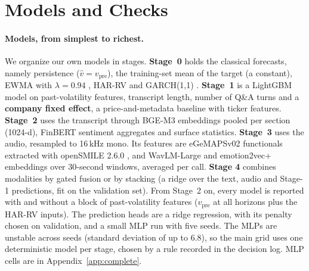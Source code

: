 \section{Models and Checks}
\label{sec:setup}

\paragraph{Models, from simplest to richest.}
We organize our own models in stages. \textbf{Stage~0} holds the classical
forecasts, namely persistence ($\hat v = v_{\mathrm{pre}}$), the
training-set mean of the target (a constant), EWMA with
$\lambda{=}0.94$ \citep{riskmetrics1996}, HAR-RV \citep{corsi2009har}
and GARCH(1,1) \citep{bollerslev1986}. \textbf{Stage~1} is a LightGBM model
\citep{lightgbm2017} on past-volatility features, transcript length,
number of Q\&A turns and a \textbf{company fixed effect}, a price-and-metadata
baseline with ticker features. \textbf{Stage~2} uses the transcript through BGE-M3 \citep{bge2024}
embeddings pooled per section (1024-d), FinBERT \citep{finbert}
sentiment aggregates and surface statistics. \textbf{Stage~3} uses the audio,
resampled to 16\,kHz mono. Its features are eGeMAPSv02 functionals
\citep{egemaps2016} extracted with openSMILE 2.6.0 \citep{eyben2010opensmile},
and WavLM-Large \citep{wavlm} and emotion2vec+ \citep{emotion2vec} embeddings
over 30-second windows, averaged per call.
\textbf{Stage 4} combines modalities by
gated fusion or by stacking (a ridge over the text, audio and Stage-1 predictions,
fit on the validation set). From Stage~2 on, every model is reported with and
without a block of past-volatility features ($v_{\mathrm{pre}}$ at all horizons
plus the HAR-RV inputs). The prediction heads are a ridge regression, with its
penalty chosen on validation, and a small MLP run with five seeds. The MLPs are
unstable across seeds (standard deviation of \Rtwo{} up to 6.8), so the main grid
uses one deterministic model per stage, chosen by a rule recorded in the decision
log. MLP cells are in Appendix~\ref{app:complete}.

